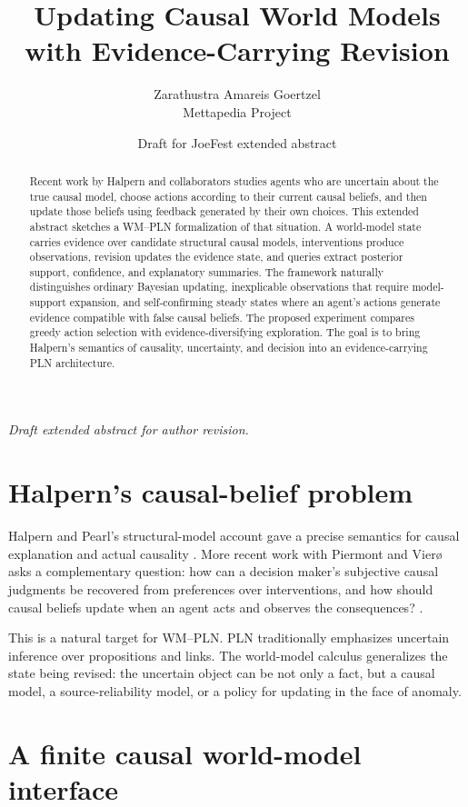\documentclass[11pt]{article}
\title{Updating Causal World Models with Evidence-Carrying Revision}
\author{Zarathustra Amareis Goertzel\\\small Mettapedia Project}
\date{Draft for JoeFest extended abstract}
\newcommand{\draftnote}{\noindent\textit{Draft extended abstract for author revision.}}
\begin{document}
\maketitle
\draftnote

\begin{abstract}
Recent work by Halpern and collaborators studies agents who are uncertain about the true causal model, choose actions according to their current causal beliefs, and then update those beliefs using feedback generated by their own choices. This extended abstract sketches a WM--PLN formalization of that situation. A world-model state carries evidence over candidate structural causal models, interventions produce observations, revision updates the evidence state, and queries extract posterior support, confidence, and explanatory summaries. The framework naturally distinguishes ordinary Bayesian updating, inexplicable observations that require model-support expansion, and self-confirming steady states where an agent's actions generate evidence compatible with false causal beliefs. The proposed experiment compares greedy action selection with evidence-diversifying exploration. The goal is to bring Halpern's semantics of causality, uncertainty, and decision into an evidence-carrying PLN architecture.
\end{abstract}

\section{Halpern's causal-belief problem}

Halpern and Pearl's structural-model account gave a precise semantics for causal explanation and actual causality \cite{HalpernPearl2005,Pearl2000}. More recent work with Piermont and Vier\o{} asks a complementary question: how can a decision maker's subjective causal judgments be recovered from preferences over interventions, and how should causal beliefs update when an agent acts and observes the consequences? \cite{HalpernPiermont2024,HalpernPiermontViero2026}.

This is a natural target for WM--PLN. PLN traditionally emphasizes uncertain inference over propositions and links. The world-model calculus generalizes the state being revised: the uncertain object can be not only a fact, but a causal model, a source-reliability model, or a policy for updating in the face of anomaly.

\section{A finite causal world-model interface}
\end{document}
